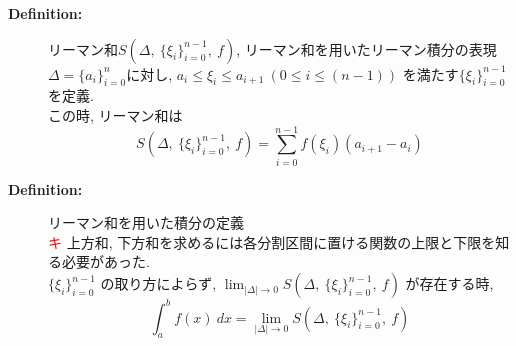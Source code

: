 \documentclass[dvipdfmx]{jsarticle}
\newcommand{\point}{\textcircled{\textcolor{red}{\scriptsize キ}} }
\begin{document}
\begin{description}
        \item[\bf{Definition:}] リーマン和$S(\Delta,\ \{ \xi_i \}_{i=0}^{n-1},\ f)$, リーマン和を用いたリーマン積分の表現 \\
            $ \Delta = \{ a_i \}_{i=0}^n $に対し, $ a_i \leq \xi_i \leq a_{i+1} \ (0 \leq i \leq (n-1)) $ を満たす$\{ \xi_i \}_{i=0}^{n-1}$を定義. \\
            この時, リーマン和は
            $$ S(\Delta,\ \{ \xi_i \}_{i=0}^{n-1},\ f) = \sum_{i=0}^{n-1} f(\xi_{i})(a_{i+1} - a_{i})$$
    
        \item[\bf{Definition:}] リーマン和を用いた積分の定義 \\
            \point 上方和, 下方和を求めるには各分割区間に置ける関数の上限と下限を知る必要があった. \\
            $ \{ \xi_i \}_{i=0}^{n-1} $ の取り方によらず, $\displaystyle \lim_{|\Delta| \to 0} S(\Delta,\ \{ \xi_i \}_{i=0}^{n-1},\ f)$ が存在する時, 
            $$ \displaystyle \int_a^b f(x) \ dx = \lim_{|\Delta| \to 0} S(\Delta,\ \{ \xi_i \}_{i=0}^{n-1},\ f) $$
            
    \end{description}
    
\end{document}
